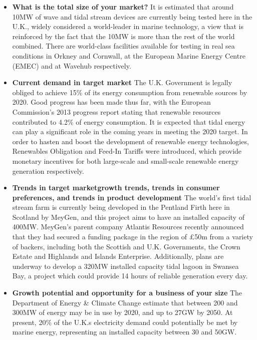 \documentclass[a4paper,11pt]{article}
\begin{document}
\begin{itemize}
	\item \textbf{What is the total size of your market?} It is estimated that around 10MW of wave and tidal stream devices are currently being tested here in the U.K.\cite{f1}, widely considered a world-leader in marine technology, a view that is reinforced by the fact that the 10MW is more than the rest of the world combined. There are world-class facilities available for testing in real sea conditions in Orkney and Cornwall, at the European Marine Energy Centre (EMEC) and at Wavehub respectively.

	\item \textbf{Current demand in target market} The U.K. Government is legally obliged to achieve 15\% of its energy consumption from renewable sources by 2020\cite{f3}. Good progress has been made thus far, with the European Commission's 2013 progress report stating that renewable resources contributed to 4.2\% of energy consumption\cite{f4}. It is expected that tidal energy can play a significant role in the coming years in meeting the 2020 target. In order to hasten and boost the development of renewable energy technologies, Renewables Obligation and Feed-In Tariffs were introduced, which provide monetary incentives for both large-scale and small-scale renewable energy generation respectively.
	
	\item \textbf{Trends in target market\textemdash growth trends, trends in consumer preferences, and trends in product development} The world's first tidal stream farm is currently being developed in the Pentland Firth here in Scotland by MeyGen, and this project aims to have an installed capacity of 400MW\cite{f5}. MeyGen’s parent company Atlantis Resources recently announced that they had secured a funding package in the region of £50m from a variety of backers, including both the Scottish and U.K. Governments, the Crown Estate and Highlands and Islands Enterprise\cite{f6}. Additionally, plans are underway to develop a 320MW installed capacity tidal lagoon in Swansea Bay, a project which could provide 14 hours of reliable generation every day\cite{f7}.
	
	\item \textbf{Growth potential and opportunity for a business of your size} The Department of Energy \& Climate Change estimate that between 200 and 300MW of energy may be in use by 2020, and up to 27GW by 2050\cite{f8}. At present, 20\% of the U.K.s electricity demand could potentially be met by marine energy, representing an installed capacity between 30 and 50GW.
	

\end{itemize}
\end{document}
